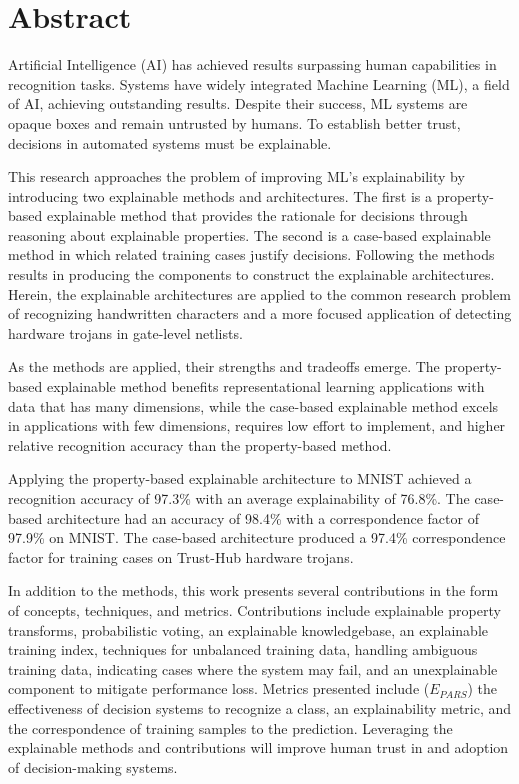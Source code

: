 \chapter*{Abstract}{
\pagestyle{plain} %

Artificial Intelligence (AI) has achieved results surpassing human capabilities
in recognition tasks. Systems have widely integrated Machine Learning (ML), a
field of AI, achieving outstanding results. Despite their success, ML systems
are opaque boxes and remain untrusted by humans. To establish better trust,
decisions in automated systems must be explainable.

This research approaches the problem of improving ML's explainability by
introducing two explainable methods and architectures. The first is a
property-based explainable method that provides the rationale for decisions
through reasoning about explainable properties. The second is a case-based
explainable method in which related training cases justify decisions. Following
the methods results in producing the components to construct the explainable
architectures. Herein, the explainable architectures are applied to the common
research problem of recognizing handwritten characters and a more focused
application of detecting hardware trojans in gate-level netlists.

As the methods are applied, their strengths and tradeoffs emerge. The
property-based explainable method benefits representational learning
applications with data that has many dimensions, while the case-based
explainable method excels in applications with few dimensions, requires low
effort to implement, and higher relative recognition accuracy than the
property-based method.

Applying the property-based explainable architecture to MNIST achieved a
recognition accuracy of 97.3\% with an average explainability of 76.8\%. The
case-based architecture had an accuracy of 98.4\% with a correspondence factor of
97.9\% on MNIST. The case-based architecture produced a 97.4\% correspondence
factor for training cases on Trust-Hub hardware trojans.

In addition to the methods, this work presents several contributions in the form
of concepts, techniques, and metrics. Contributions include explainable property
transforms, probabilistic voting, an explainable knowledgebase, an explainable
training index, techniques for unbalanced training data, handling ambiguous
training data, indicating cases where the system may fail, and an unexplainable
component to mitigate performance loss. Metrics presented include ($E_{PARS}$)
the effectiveness of decision systems to recognize a class, an explainability
metric, and the correspondence of training samples to the prediction. Leveraging
the explainable methods and contributions will improve human trust in and
adoption of decision-making systems.

\thispagestyle{plain} %
}
